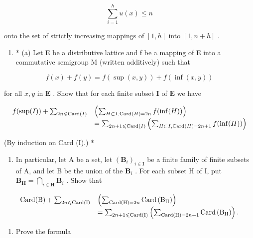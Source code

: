 \[
\sum_ {i = 1} ^ {h} u (x) \leqslant n
\]

onto the set of strictly increasing mappings of \([1, h]\) into \([1, n + h]\) .

\begin{enumerate}
\def\labelenumi{\arabic{enumi}.}
\setcounter{enumi}{4}
\tightlist
\item
  * (a) Let E be a distributive lattice and f be a mapping of E into a commutative semigroup M (written additively) such that
\end{enumerate}

\[
f (x) + f (y) = f (\sup (x, y)) + f (\inf (x, y))
\]

for all \(x, y\) in \(\mathbf{E}\) . Show that for each finite subset \(\mathbf{I}\) of \(\mathbf{E}\) we have

\[
\begin{array}{r l} f (\sup (I)) + \sum_ {2 n \leqslant \operatorname{Card} (I)} & \left(\sum_ {H \subset I, \operatorname{Card} (H) = 2 n} f (\inf (H))\right) \\ & = \sum_ {2 n + 1 \leqslant \operatorname{Card} (I)} \left(\sum_ {H \subset I, \operatorname{Card} (H) = 2 n + 1} f (\inf (H))\right) \end{array}
\]

(By induction on Card (I).) *

\begin{enumerate}
\def\labelenumi{(\alph{enumi})}
\setcounter{enumi}{1}
\tightlist
\item
  In particular, let A be a set, let \((\mathbf{B}_i)_{i\in \mathbf{I}}\) be a finite family of finite subsets of A, and let B be the union of the \(\mathbf{B}_i\) . For each subset H of I, put \(\mathbf{B}_{\mathbf{H}} = \bigcap_{i\in \mathbf{H}}\mathbf{B}_i\) . Show that
\end{enumerate}

\[
\begin{array}{r l} \operatorname{Card} (\mathrm{B}) + \sum_ {2 n \leqslant \operatorname{Card} (\mathrm{I})} & \left(\sum_ {\operatorname{Card} (\mathrm{H}) = 2 n} \operatorname{Card} \left(\mathrm{B} _ {\mathrm{H}}\right)\right) \\ & = \sum_ {2 n + 1 \leqslant \operatorname{Card} (\mathrm{I})} \left(\sum_ {\operatorname{Card} (\mathrm{H}) = 2 n + 1} \operatorname{Card} \left(\mathrm{B} _ {\mathrm{H}}\right)\right). \end{array}
\]

\begin{enumerate}
\def\labelenumi{\arabic{enumi}.}
\setcounter{enumi}{5}
\tightlist
\item
  Prove the formula
\end{enumerate}

